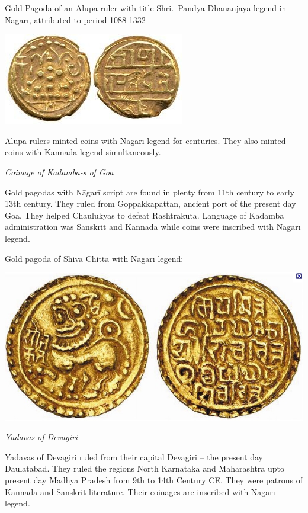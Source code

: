 Gold Pagoda of an Alupa ruler with title Shri.\ Pandya Dhananjaya legend in Nāgarī, attributed to period 1088-1332

\vskip 3pt

\centerline{\includegraphics[scale=0.53]{"images/article-06/art06-fig15.jpg"}}

Alupa rulers minted coins with Nāgarī legend for centuries. They also minted coins with Kannada legend simultaneously.

\textit{Coinage of Kadamba-s of Goa}

Gold pagodas with Nāgarī script are found in plenty from 11th century to early 13th century. They ruled from Goppakkapattan, ancient port of the present day Goa. They helped Chaulukyas to defeat Rashtrakuta. Language of Kadamba administration was Sanskrit and Kannada while coins were inscribed with Nāgarī legend.

Gold pagoda of Shiva Chitta with Nāgarī legend:

\vskip 3pt

\centerline{\includegraphics[scale=0.6]{"images/article-06/art06-fig16.jpg"}}

\textit{Yadavas of Devagiri}

Yadavas of Devagiri ruled from their capital Devagiri – the present day Daulatabad. They ruled the regions North Karnataka and Maharashtra upto present day Madhya Pradesh from 9th to 14th Century CE. They were patrons of Kannada and Sanskrit literature. Their coinages are inscribed with Nāgarī legend.

